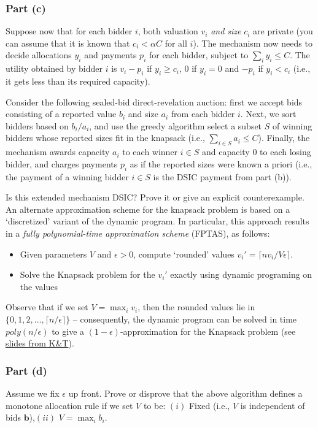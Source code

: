 \documentclass[letterpaper,11pt]{article}
\begin{document}
\subsubsection*{Part (c)} 
Suppose now that for each bidder $i$, both valuation $v_i$ \emph{and size} $c_i$ are private (you can assume that it is known that $c_i<\alpha C$ for all $i$). The mechanism now needs to decide allocations $y_i$ and payments $p_i$ for each bidder, subject to $\sum_i y_i \leq C$. The utility obtained by bidder $i$ is $v_i-p_i$ if $y_i\geq c_i$, $0$ if $y_i=0$ and $-p_i$ if $y_i<c_i$ (i.e., it gets less than its required capacity).

Consider the following sealed-bid direct-revelation auction: first we accept bids consisting of a reported value $b_i$ and size $a_i$ from each bidder $i$. Next, we sort bidders based on $b_i/a_i$, and use the greedy algorithm select a subset $S$ of winning bidders whose reported sizes fit in the knapsack (i.e., $\sum_{i\in S}a_i\leq C$). Finally, the mechanism awards capacity $a_i$ to each winner $i\in S$ and capacity 0 to each losing bidder, and charges payments $p_i$ as if the reported sizes were known a priori (i.e., the payment of a winning bidder $i\in S$ is the DSIC payment from part (b)).

Is this extended mechanism DSIC? Prove it or give an explicit counterexample.\\


\noindent An alternate approximation scheme for the knapsack problem is based on a `discretized' variant of the dynamic program. In particular, this approach results in a \emph{fully polynomial-time approximation scheme} (FPTAS), as follows: 
\begin{itemize}[nosep]
\item Given parameters $V$ and $\epsilon >0$, compute `rounded' values $v_i'=\lceil nv_i/V\epsilon\rceil$.
\item Solve the Knapsack problem for the $v_i'$ exactly using dynamic programing on the values
\end{itemize}
Observe that if we set $V= \max_i v_i$, then the rounded values lie in $\{0,1,2,\ldots,\lceil n/\epsilon\rceil\}$ -- consequently, the dynamic program can be solved in time $poly(n/\epsilon)$ to give a $(1-\epsilon)$-approximation for the Knapsack problem (see \href{http://www.cs.princeton.edu/~wayne/kleinberg-tardos/pdf/11ApproximationAlgorithms.pdf}{slides from K\&T}).

\subsubsection*{Part (d)} 
Assume we fix $\epsilon$ up front. Prove or disprove that the above algorithm defines a monotone allocation rule if we set $V$ to be: $(i)$ Fixed (i.e., $V$ is independent of bids $\mathbf{b}$)\quad,\quad$(ii)$ $V = \max_i b_i$.
\end{document}
